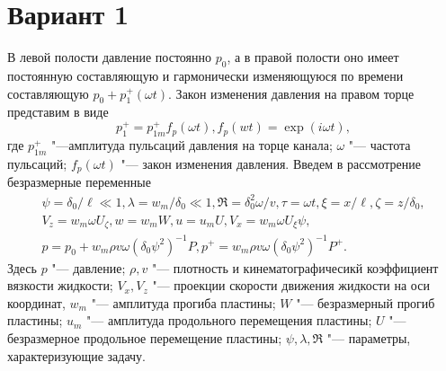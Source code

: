 \documentclass{article}
\begin{document}
\section*{Вариант 1}
В левой полости давление постоянно $p_0$, а в правой полости оно имеет постоянную составляющую и гармонически изменяющуюся по времени составляющую $p_0+p_1^+(\omega t)$. Закон изменения давления на правом торце представим в виде
\begin{equation}
    p_1^+=p_{1m}^+f_p(\omega t),    f_p(wt)=\exp(i \omega t),
\end{equation}
где $p_{1m}^+$ "---амплитуда пульсаций давления на торце канала; $\omega$ "--- частота пульсаций; $f_p(\omega t)$ "--- закон изменения давления.
Введем в рассмотрение безразмерные переменные
\begin{equation}
\begin{split}
        \psi = \delta_0/\ell \ll 1, \lambda = w_m/\delta_0 \ll 1, \Re = \delta_0^2\omega/v, \tau = \omega t, \xi = x/\ell, \zeta = z/\delta_0, \\
    V_z = w_m \omega U_\zeta, w = w_mW, u = u_mU, V_x = w_m \omega U_\xi \psi, \\
    p = p_0 + w_m\rho v \omega(\delta_0 \psi^2)^{-1}P, p^+ = w_m \rho v \omega(\delta_0 \psi^2)^{-1}P^+.
\end{split}
\end{equation}
Здесь $p$ "--- давление; $\rho, v$ "--- плотность и кинематографичесикй коэффициент вязкости жидкости; $V_x, V_z$ "--- проекции скорости движения жидкости на оси координат, $w_m$ "--- амплитуда прогиба пластины; $W$ "--- безразмерный прогиб пластины; $u_m$ "--- амплитуда продольного перемещения пластины; $U$ "--- безразмерное продольное перемещение пластины; $\psi, \lambda, \Re$ "--- параметры, характеризующие задачу.
\end{document}
